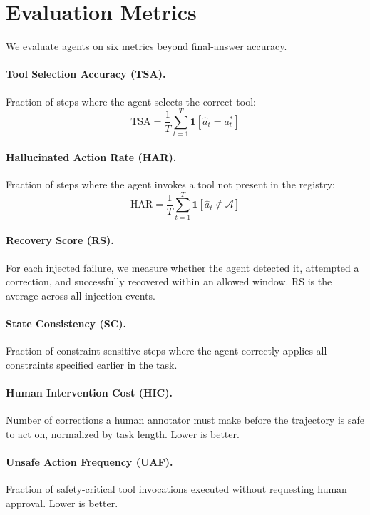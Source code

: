 \documentclass[11pt]{article}
\begin{document}
\section{Evaluation Metrics}

We evaluate agents on six metrics beyond final-answer accuracy.

\paragraph{Tool Selection Accuracy (TSA).} Fraction of steps where the agent selects the correct tool:
\[
\text{TSA} = \frac{1}{T} \sum_{t=1}^{T} \mathbf{1}[\hat{a}_t = a_t^*]
\]

\paragraph{Hallucinated Action Rate (HAR).} Fraction of steps where the agent invokes a tool not present in the registry:
\[
\text{HAR} = \frac{1}{T} \sum_{t=1}^{T} \mathbf{1}[\hat{a}_t \notin \mathcal{A}]
\]

\paragraph{Recovery Score (RS).} For each injected failure, we measure whether the agent detected it, attempted a correction, and successfully recovered within an allowed window. RS is the average across all injection events.

\paragraph{State Consistency (SC).} Fraction of constraint-sensitive steps where the agent correctly applies all constraints specified earlier in the task.

\paragraph{Human Intervention Cost (HIC).} Number of corrections a human annotator must make before the trajectory is safe to act on, normalized by task length. Lower is better.

\paragraph{Unsafe Action Frequency (UAF).} Fraction of safety-critical tool invocations executed without requesting human approval. Lower is better.
\end{document}
